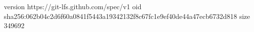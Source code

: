 version https://git-lfs.github.com/spec/v1
oid sha256:062b04c2d6f60a0841f5443a19342132f8c67fc1e9ef40de44a47ecb6732d818
size 349692
